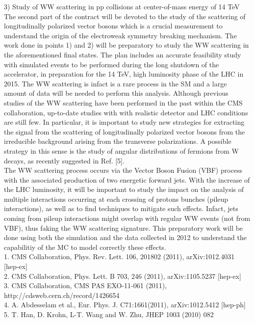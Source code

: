\documentclass[10pt, a4paper]{article}
\begin{document}
 
3) Study of WW scattering in pp collisions at center-of-mass energy of 14 TeV \\
The second part of the contract will be devoted to the study 
of the scattering of longitudinally polarized vector bosons which is 
a crucial measurement to understand the origin of the electroweak symmetry breaking mechanism. 
The work done in points 1) and 2) will be preparatory to study the WW scattering 
in the aforementioned final states.
The plan includes an accurate feasibility study with simulated events to be performed 
during the long shutdown of the accelerator, in preparation for the 14 TeV, high 
luminosity phase of the LHC in 2015. The WW scattering is infact is a rare process 
in the SM and a large amount of data will be needed to perform this analysis. 
Although previous studies of the WW scattering have been performed in the 
past within the CMS collaboration, up-to-date studies with with realistic detector and 
LHC conditions are still few. In particular, it is important to study new strategies for extracting the signal from the scattering of longitudinally polarized vector bosons from the irreducible background arising from the transverse polarizations. A possible strategy in this sense is the study of angular distributions of fermions from W decays, as recently suggested in Ref. [5]. \\
The WW scattering process occurs via the Vector Boson Fusion (VBF) process
with the associated production of two energetic forward jets. With the increase of the 
LHC luminosity, it will be important to study the impact on the analysis of multiple 
interactions occurring at each crossing of protons 
bunches (pileup interactions), as well as to find techniques to mitigate such effects.
Infact, jets coming from pileup interactions might overlap with regular 
WW events (not from VBF), thus faking the WW scattering signature. This preparatory
work will be done using both the simulation and the data collected in 2012 to understand the 
capabilitiy of the MC to model correctly these effects. \\


1. CMS Collaboration, Phys. Rev. Lett. 106, 201802 (2011), arXiv:1012.4031 [hep-ex] \\ 
2. CMS Collaboration, Phys. Lett. B 703, 246 (2011), arXiv:1105.5237 [hep-ex] \\
3. CMS Collaboration, CMS PAS EXO-11-061 (2011), http://cdsweb.cern.ch/record/1426654  \\ 
4. A. Abdesselam et al., Eur. Phys. J. C71:1661(2011), arXiv:1012.5412 [hep-ph] \\
5. T. Han, D. Krohn, L-T. Wang and W. Zhu, JHEP 1003 (2010) 082 \\
  
\end{document}
